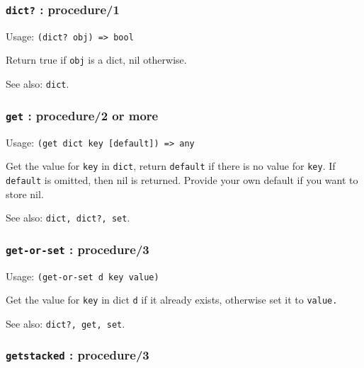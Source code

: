 \documentclass[
]{article}
\newcommand{\passthrough}[1]{#1}
\begin{document}
\hypertarget{dict-procedure1}{%
\subsubsection{\texorpdfstring{\texttt{dict?} :
procedure/1}{dict? : procedure/1}}\label{dict-procedure1}}

Usage: \passthrough{\lstinline!(dict? obj) => bool!}

Return true if \passthrough{\lstinline!obj!} is a dict, nil otherwise.

See also: \passthrough{\lstinline!dict!}.

\hypertarget{get-procedure2-or-more}{%
\subsubsection{\texorpdfstring{\texttt{get} : procedure/2 or
more}{get : procedure/2 or more}}\label{get-procedure2-or-more}}

Usage: \passthrough{\lstinline!(get dict key [default]) => any!}

Get the value for \passthrough{\lstinline!key!} in
\passthrough{\lstinline!dict!}, return \passthrough{\lstinline!default!}
if there is no value for \passthrough{\lstinline!key!}. If
\passthrough{\lstinline!default!} is omitted, then nil is returned.
Provide your own default if you want to store nil.

See also: \passthrough{\lstinline!dict, dict?, set!}.

\hypertarget{get-or-set-procedure3}{%
\subsubsection{\texorpdfstring{\texttt{get-or-set} :
procedure/3}{get-or-set : procedure/3}}\label{get-or-set-procedure3}}

Usage: \passthrough{\lstinline!(get-or-set d key value)!}

Get the value for \passthrough{\lstinline!key!} in dict
\passthrough{\lstinline!d!} if it already exists, otherwise set it to
\passthrough{\lstinline!value.!}

See also: \passthrough{\lstinline!dict?, get, set!}.

\hypertarget{getstacked-procedure3}{%
\subsubsection{\texorpdfstring{\texttt{getstacked} :
procedure/3}{getstacked : procedure/3}}\label{getstacked-procedure3}}
\end{document}
